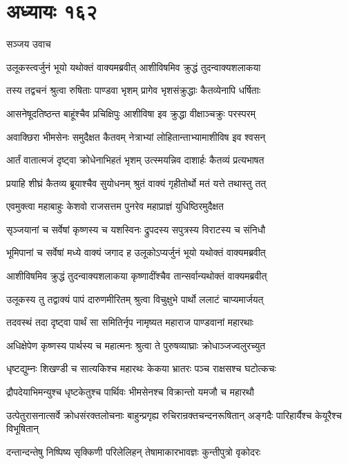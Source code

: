 \chapter{अध्यायः १६२}
\twolineshloka
{सञ्जय उवाच}
{}


\twolineshloka
{उलूकस्त्वर्जुनं भूयो यथोक्तं वाक्यमब्रवीत्}
{आशीविषमिव क्रुद्धं तुदन्वाक्यशलाकया}


\twolineshloka
{तस्य तद्वचनं श्रुत्वा रुषिताः पाण्डवा भृशम्}
{प्रागेव भृशसंक्रुद्धाः कैतव्येनापि धर्षिताः}


\twolineshloka
{आसनेषूदतिष्ठन्त बाहूंश्चैव प्रचिक्षिपुः}
{आशीविषा इव क्रुद्धा वीक्षाञ्चक्रुः परस्परम्}


\twolineshloka
{अवाक्छिरा भीमसेनः समुदैक्षत कैतवम्}
{नेत्राभ्यां लोहितान्ताभ्यामाशीविष इव श्वसन्}


\twolineshloka
{आर्तं वातात्मजं दृष्ट्वा क्रोधेनाभिहतं भृशम्}
{उत्स्मयन्निव दाशार्हः कैतव्यं प्रत्यभाषत}


\twolineshloka
{प्रयाहि शीघ्रं कैतव्य ब्रूयाश्चैव सुयोधनम्}
{श्रुतं वाक्यं गृहीतोर्थो मतं यत्ते तथास्तु तत्}


\twolineshloka
{एवमुक्त्वा महाबाहुः केशवो राजसत्तम}
{पुनरेव महाप्राज्ञं युधिष्ठिरमुदैक्षत}


\twolineshloka
{सृञ्जयानां च सर्वेषां कृष्णस्य च यशस्विनः}
{द्रुपदस्य सपुत्रस्य विराटस्य च संनिधौ}


\twolineshloka
{भूमिपानां च सर्वेषां मध्ये वाक्यं जगाद ह}
{उलूकोऽप्यर्जुनं भूयो यथोक्तं वाक्यमब्रवीत्}


\twolineshloka
{आशीविषमिव क्रुद्धं तुदन्वाक्यशलाकया}
{कृष्णादींश्चैव तान्सर्वान्यथोक्तं वाक्यमब्रवीत्}


\twolineshloka
{उलूकस्य तु तद्वाक्यं पापं दारुणमीरितम्}
{श्रुत्वा विचुक्षुभे पार्थो ललाटं चाप्यमार्जयत्}


\twolineshloka
{तदवस्थं तदा दृष्ट्वा पार्थं सा समितिर्नृप}
{नामृष्यत महाराज पाण्डवानां महारथाः}


\twolineshloka
{अधिक्षेपेण कृष्णस्य पार्थस्य च महात्मनः}
{श्रुत्वा ते पुरुषव्याघ्राः क्रोधाञ्जज्वलुरच्युत}


\twolineshloka
{धृष्टद्युम्नः शिखण्डी च सात्यकिश्च महारथः}
{केकया भ्रातरः पञ्च राक्षसश्च घटोत्कचः}


\twolineshloka
{द्रौपदेयाभिमन्युश्च धृष्टकेतुश्च पार्थिवः}
{भीमसेनश्च विक्रान्तो यमजौ च महारथौ}


\threelineshloka
{उत्पेतुरासनात्सर्वे क्रोधसंरक्तलोचनाः}
{बाहुन्प्रगृह्य रुचिरान्रक्तचन्दनरूषितान्}
{अङ्गदैः पारिहार्यैश्च केयूरैश्च विभूषितान्}


\twolineshloka
{दन्तान्दन्तेषु निष्पिष्य सृक्किणी परिलेलिहन्}
{तेषामाकारभावज्ञः कुन्तीपुत्रो वृकोदरः}


